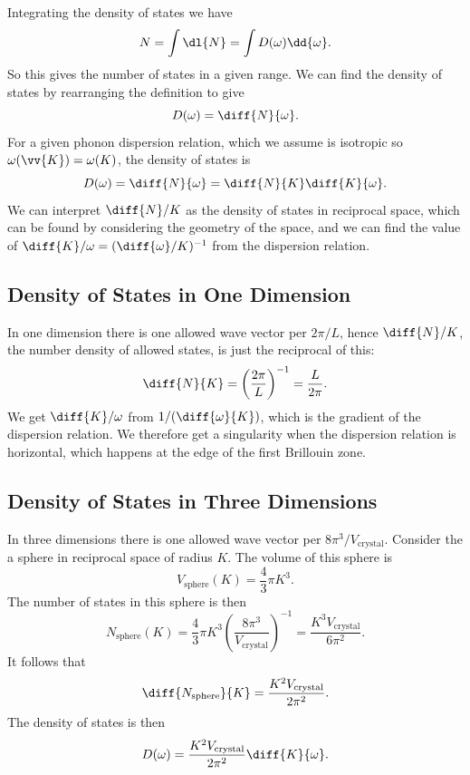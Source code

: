 \documentclass[fleqn]{NotesClass}
\begin{document}
    Integrating the density of states we have
    \begin{equation}
        N = \int\dl{N} = \int D(\omega) \dd{\omega}.
    \end{equation}
    So this gives the number of states in a given range.
    We can find the density of states by rearranging the definition to give
    \begin{equation}
        D(\omega) = \diff{N}{\omega}.
    \end{equation}
    For a given phonon dispersion relation, which we assume is isotropic so \(\omega(\vv{K}) = \omega(K)\), the density of states is
    \begin{equation}
        D(\omega) = \diff{N}{\omega} = \diff{N}{K} \diff{K}{\omega}.
    \end{equation}
    We can interpret \(\diff{N}/{K}\) as the density of states in reciprocal space, which can be found by considering the geometry of the space, and we can find the value of \(\diff{K}/{\omega} = (\diff{\omega}/{K})^{-1}\) from the dispersion relation.
    
    \subsection{Density of States in One Dimension}
    In one dimension there is one allowed wave vector per \(2\pi/L\), hence \(\diff{N}/{K}\), the number density of allowed states, is just the reciprocal of this:
    \begin{equation}
        \diff{N}{K} = \left( \frac{2\pi}{L} \right)^{-1} = \frac{L}{2\pi}.
    \end{equation}
    We get \(\diff{K}/{\omega}\) from \(1/(\diff{\omega}{K})\), which is the gradient of the dispersion relation.
    We therefore get a singularity when the dispersion relation is horizontal, which happens at the edge of the first Brillouin zone.
    
    \subsection{Density of States in Three Dimensions}
    In three dimensions there is one allowed wave vector per \(8\pi^3/V_{\mathrm{crystal}}\).
    Consider the a sphere in reciprocal space of radius \(K\).
    The volume of this sphere is
    \begin{equation}
        V_{\mathrm{sphere}}(K) = \frac{4}{3}\pi K^3.
    \end{equation}
    The number of states in this sphere is then
    \begin{equation}
        N_{\mathrm{sphere}}(K) = \frac{4}{3}\pi K^3 \left( \frac{8\pi^3}{V_{\mathrm{crystal}}} \right)^{-1} = \frac{K^3V_{\mathrm{crystal}}}{6\pi^2}.
    \end{equation}
    It follows that
    \begin{equation}
        \diff{N_{\mathrm{sphere}}}{K} = \frac{K^2V_{\mathrm{crystal}}}{2\pi^2}.
    \end{equation}
    The density of states is then
    \begin{equation}
        D(\omega) = \frac{K^2V_{\mathrm{crystal}}}{2\pi^2} \diff{K}{\omega}.
    \end{equation}
    
\end{document}

